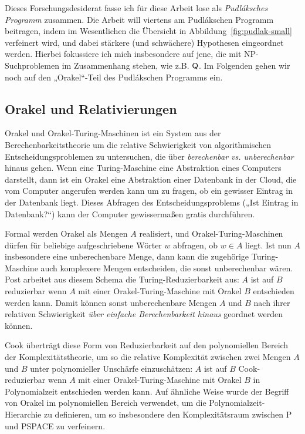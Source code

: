 Dieses Forschungsdesiderat fasse ich für diese Arbeit lose als \emph{Pudláksches Programm} zusammen.
Die Arbeit will viertens am Pudlákschen Programm beitragen, indem im Wesentlichen die Übersicht in Abbildung~\ref{fig:pudlak-small} verfeinert wird, und dabei stärkere (und schwächere) Hypothesen eingeordnet werden. Hierbei fokussiere ich mich insbesondere auf jene, die mit NP-Suchproblemen im Zusammenhang stehen, wie z.B. $\mathsf{Q}$.
Im Folgenden gehen wir noch auf den „Orakel“-Teil des Pudlákschen Programms ein.

\subsection*{Orakel und Relativierungen}

Orakel und Orakel-Turing-Maschinen ist ein System aus der Berechenbarkeitstheorie um die relative Schwierigkeit von algorithmischen Entscheidungsproblemen zu untersuchen, die über \emph{berechenbar vs. unberechenbar} hinaus gehen. Wenn eine Turing-Maschine eine Abstraktion eines Computers darstellt, dann ist ein Orakel eine Abstraktion einer Datenbank in der Cloud, die vom Computer angerufen werden kann um zu fragen, ob ein gewisser Eintrag in der Datenbank liegt. Dieses Abfragen des Entscheidungsproblems („Ist Eintrag in Datenbank?“) kann der Computer gewissermaßen gratis durchführen.

Formal werden Orakel als Mengen $A$ realisiert, und Orakel-Turing-Maschinen dürfen für beliebige aufgeschriebene Wörter $w$ abfragen, ob $w\in A$ liegt. Ist nun $A$ insbesondere eine unberechenbare Menge, dann kann die zugehörige Turing-Maschine auch komplexere Mengen entscheiden, die sonst unberechenbar wären.
Post arbeitet aus diesem Schema die Turing-Reduzierbarkeit aus: $A$ ist auf $B$ reduzierbar wenn $A$ mit einer Orakel-Turing-Maschine mit Orakel $B$ entschieden werden kann. Damit können sonst unberechenbare Mengen $A$ und $B$ nach ihrer relativen Schwierigkeit \emph{über einfache Berechenbarkeit hinaus} geordnet werden können. 

Cook überträgt diese Form von Reduzierbarkeit auf den polynomiellen Bereich der Komplexitätstheorie, um so die relative Komplexität zwischen zwei Mengen $A$ und $B$ unter polynomieller Unschärfe einzuschätzen: $A$ ist auf $B$ Cook-reduzierbar wenn $A$ mit einer Orakel-Turing-Maschine mit Orakel $B$ in Polynomialzeit entschieden werden kann. Auf ähnliche Weise wurde der Begriff von Orakel im polynomiellen Bereich verwendet, um die Polynomialzeit-Hierarchie zu definieren, um so insbesondere den Komplexitätsraum zwischen P und PSPACE zu verfeinern.

